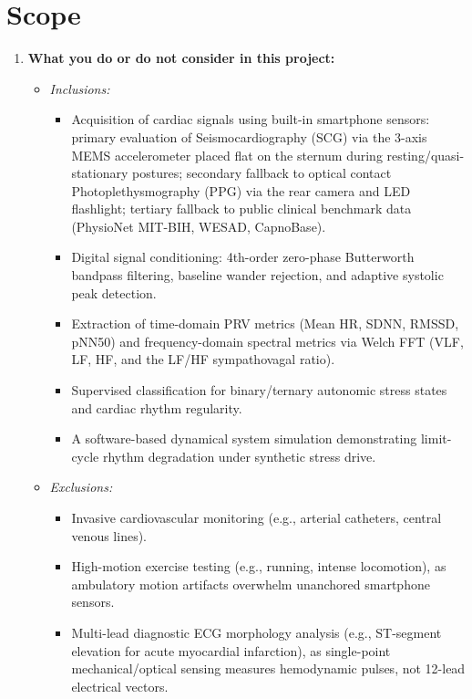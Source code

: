 \documentclass[11pt,a4paper]{article}
\begin{document}
\section{Scope}
\begin{enumerate}[leftmargin=2.5em]
    \item \textbf{What you do or do not consider in this project:}
    \begin{itemize}
        \item \textit{Inclusions:} 
        \begin{itemize}
            \item Acquisition of cardiac signals using built-in smartphone sensors: primary evaluation of Seismocardiography (SCG) via the 3-axis MEMS accelerometer placed flat on the sternum during resting/quasi-stationary postures; secondary fallback to optical contact Photoplethysmography (PPG) via the rear camera and LED flashlight; tertiary fallback to public clinical benchmark data (PhysioNet MIT-BIH, WESAD, CapnoBase).
            \item Digital signal conditioning: 4th-order zero-phase Butterworth bandpass filtering, baseline wander rejection, and adaptive systolic peak detection.
            \item Extraction of time-domain PRV metrics (Mean HR, SDNN, RMSSD, pNN50) and frequency-domain spectral metrics via Welch FFT (VLF, LF, HF, and the LF/HF sympathovagal ratio).
            \item Supervised classification for binary/ternary autonomic stress states and cardiac rhythm regularity.
            \item A software-based dynamical system simulation demonstrating limit-cycle rhythm degradation under synthetic stress drive.
        \end{itemize}
        \item \textit{Exclusions:}
        \begin{itemize}
            \item Invasive cardiovascular monitoring (e.g., arterial catheters, central venous lines).
            \item High-motion exercise testing (e.g., running, intense locomotion), as ambulatory motion artifacts overwhelm unanchored smartphone sensors.
            \item Multi-lead diagnostic ECG morphology analysis (e.g., ST-segment elevation for acute myocardial infarction), as single-point mechanical/optical sensing measures hemodynamic pulses, not 12-lead electrical vectors.
        \end{itemize}
    \end{itemize}


\end{enumerate}
\end{document}
